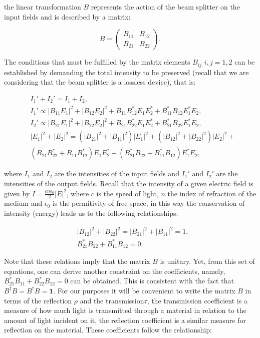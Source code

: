 \documentclass{book}
\begin{document}
the linear transformation $B$ represents the action of the beam splitter on the input fields and is described by a matrix:

\begin{equation}
B=\begin{pmatrix} B_{11}& B_{12} \\B_{21} & B_{22} \end{pmatrix}.
\end{equation}

The conditions  that must be fulfilled by the matrix elements $B_{ij}$  $i,j=1,2$  can be established by demanding the total intensity to be preserved (recall that we are considering that the beam splitter is a lossless device), that is:

\begin{align}
&I_{1}'+I_{2}'=I_{1}+I_{2}, \\
&I_{1}'\propto|B_{11} E_{1}|^{2}+|B_{12} E_{2}|^{2}+B_{11} B_{12}^{*} E_{1} E_{2}^{*}+B_{11}^{*} B_{12} E_{1}^{*} E_{2}, \\
&I_{2}'\propto|B_{21} E_{1}|^{2}+|B_{22} E_{2}|^{2}+B_{21} B_{22}^{*} E_{1} E_{2}^{*}+B_{21}^{*} B_{22} E_{1}^{*} E_{2},\\
&|E_{1}|^{2}+|E_{2}|^{2}=(|B_{21}|^{2}+|B_{11}|^{2})|E_{1}|^{2}+(|B_{12}|^{2}+|B_{22}|^{2})|E_{2}|^{2}+\\
&(B_{21} B_{22}^{*}+B_{11} B_{12}^{*})E_{1} E_{2}^{*}+(B_{21}^{*} B_{22}+B_{11}^{*} B_{12})E_{1}^{*} E_{2},
\end{align}

where $I_{1}$ and $I_{2}$ are the intensities of the input fields and $I_{1}'$ and $I_{2}'$ are the intensities of the output fields. Recall that the intensity of a given electric field is given by $I=\frac{c n \epsilon_{0}}{2} |E|^{2}$, where $c$ is the speed of light, $n$ the index of refraction of the medium and $\epsilon_{0}$ is the permitivity of free space, in this way the conservation of intensity (energy) leads us to the following relationships:

\begin{align}
&|B_{12}|^{2}+|B_{22}|^{2}=|B_{21}|^{2}+|B_{11}|^{2}=1,\\
&B_{21}^{*} B_{22}+B_{11}^{*} B_{12}=0.
\end{align}

Note that these relations imply that the matrix $B$ is unitary. Yet, from this set of equations, one can derive another constraint on the coefficients, namely, $B_{21}^{*} B_{11}+B_{22}^{*} B_{12}=0$ can be obtained. This is consistent with the fact that $B^{\dagger}B=B^{\dagger}B= \mathbf{1}$. For our purposes it will be convenient to write the matrix $B$ in terms of the reflection $\rho$ and the transmission$\tau$, the transmission coefficient is a measure of how much light is transmitted through a material in relation to the amount of light incident on it, the reflection coefficient is a similar measure for reflection on the material. These coefficients follow the relationship:
\end{document}
